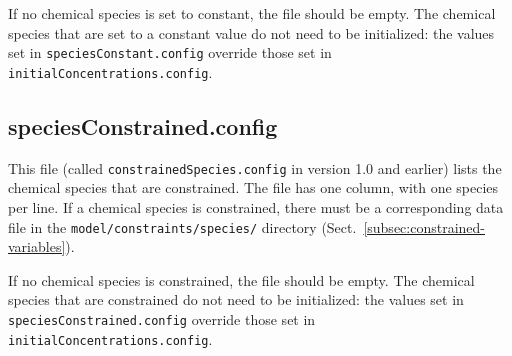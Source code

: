 If no chemical species is set to constant, the file should be empty.
The chemical species that are set to a constant value do not need to
be initialized: the values set in \texttt{speciesConstant.config}
override those set in \texttt{initialConcentrations.config}.

\subsection{speciesConstrained.config} \label{subsec:speciesconstrained}

This file (called \texttt{constrainedSpecies.config} in version 1.0
and earlier) lists the chemical species that are constrained. The file
has one column, with one species per line. If a chemical species is
constrained, there must be a corresponding data file in the
\texttt{model/constraints/species/} directory
(Sect.~\ref{subsec:constrained-variables}).

If no chemical species is constrained, the file should be empty. The
chemical species that are constrained do not need to be initialized:
the values set in \texttt{speciesConstrained.config} override those
set in \texttt{initialConcentrations.config}.
